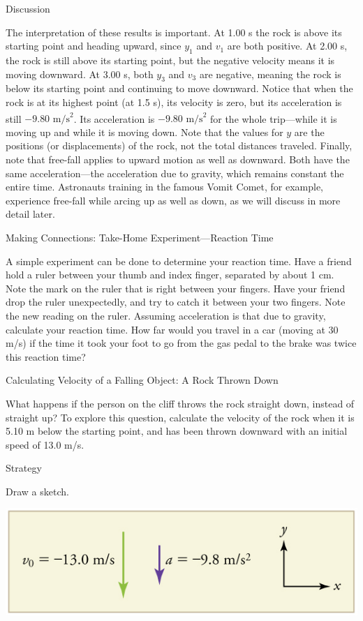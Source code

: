 \documentclass[
]{book}
\begin{document}
{Discussion}

The interpretation of these results is important. At 1.00 s the rock is
above its starting point and heading upward, since \(y_{1}{}\) and
\(v_{1}{}\) are both positive. At 2.00 s, the rock is still above its
starting point, but the negative velocity means it is moving downward.
At 3.00 s, both \(y_{3}{}\) and \(v_{3}{}\) are negative, meaning the rock
is below its starting point and continuing to move downward. Notice that
when the rock is at its highest point (at 1.5 s), its velocity is zero,
but its acceleration is still \({{- 9}\text{.}\text{80\ m/s}^{2}}{}\). Its
acceleration is
\({{- 9}\text{.}\text{80\ m/s}^{2}}{}\)\textsuperscript{}
for the whole trip---while it is moving up and while it is moving down.
Note that the values for \(y{}\)\emph{} are the
positions (or displacements) of the rock, not the total distances
traveled. Finally, note that free-fall applies to upward motion as well
as downward. Both have the same acceleration---the acceleration due to
gravity, which remains constant the entire time. Astronauts training in
the famous Vomit Comet, for example, experience free-fall while arcing
up as well as down, as we will discuss in more detail later.

\hypertarget{fs-id1773192}{}
Making Connections: Take-Home Experiment---Reaction Time

A simple experiment can be done to determine your reaction time. Have a
friend hold a ruler between your thumb and index finger, separated by
about 1 cm. Note the mark on the ruler that is right between your
fingers. Have your friend drop the ruler unexpectedly, and try to catch
it between your two fingers. Note the new reading on the ruler. Assuming
acceleration is that due to gravity, calculate your reaction time. How
far would you travel in a car (moving at 30 m/s) if the time it took
your foot to go from the gas pedal to the brake was twice this reaction
time?

\hypertarget{fs-id2186600}{}
Calculating Velocity of a Falling Object: A Rock Thrown Down

What happens if the person on the cliff throws the rock straight down,
instead of straight up? To explore this question, calculate the velocity
of the rock when it is 5.10 m below the starting point, and has been
thrown downward with an initial speed of 13.0 m/s.

{Strategy}

Draw a sketch.

\includegraphics{images/Figure_02_06_01a.jpg}
\end{document}
